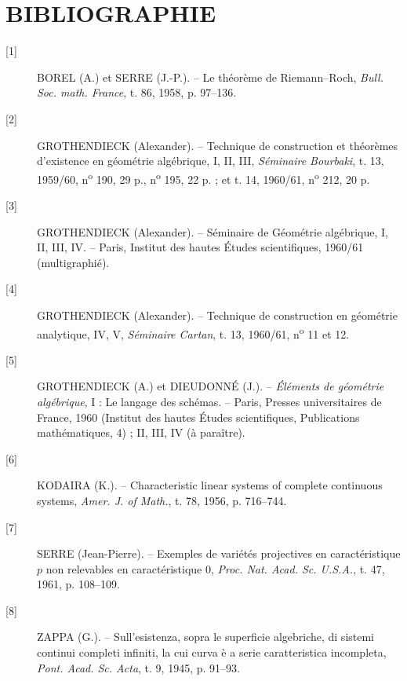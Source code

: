 \section*{BIBLIOGRAPHIE}

\begin{description}
\item[{[1]}] BOREL (A.) et SERRE (J.-P.). -- Le théorème de Riemann--Roch,
\emph{Bull. Soc. math. France}, t. 86, 1958, p. 97--136.

\item[{[2]}] GROTHENDIECK (Alexander). -- Technique de construction et
théorèmes d'existence en géométrie algébrique, I, II, III, \emph{Séminaire
Bourbaki}, t. 13, 1959/60, n\textsuperscript{o} 190, 29 p.,
n\textsuperscript{o} 195, 22 p. ; et t. 14, 1960/61,
n\textsuperscript{o} 212, 20 p.

\item[{[3]}] GROTHENDIECK (Alexander). -- Séminaire de Géométrie algébrique,
I, II, III, IV. -- Paris, Institut des hautes Études scientifiques, 1960/61
(multigraphié).

\item[{[4]}] GROTHENDIECK (Alexander). -- Technique de construction en
géométrie analytique, IV, V, \emph{Séminaire Cartan}, t. 13, 1960/61,
n\textsuperscript{o} 11 et 12.

\item[{[5]}] GROTHENDIECK (A.) et DIEUDONNÉ (J.). -- \emph{Éléments de
géométrie algébrique}, I : Le langage des schémas. -- Paris, Presses
universitaires de France, 1960 (Institut des hautes Études scientifiques,
Publications mathématiques, 4) ; II, III, IV (à paraître).

\item[{[6]}] KODAIRA (K.). -- Characteristic linear systems of complete
continuous systems, \emph{Amer. J. of Math.}, t. 78, 1956, p. 716--744.

\item[{[7]}] SERRE (Jean-Pierre). -- Exemples de variétés projectives en
caractéristique $p$ non relevables en caractéristique 0, \emph{Proc. Nat. Acad.
Sc. U.S.A.}, t. 47, 1961, p. 108--109.

\item[{[8]}] ZAPPA (G.). -- Sull'esistenza, sopra le superficie algebriche, di
sistemi continui completi infiniti, la cui curva è a serie caratteristica
incompleta, \emph{Pont. Acad. Sc. Acta}, t. 9, 1945, p. 91--93.
\end{description}

